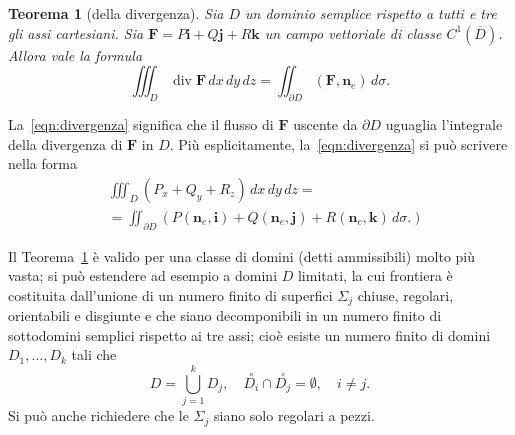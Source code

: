 \documentclass[a4paper]{book}
\DeclareMathOperator{\divg}{div}
\numberwithin{equation}{section}
\theoremstyle{plain}
\newtheorem{teor}{Teorema}[section]
\theoremstyle{definition}
\theoremstyle{remark}
\renewcommand{\vec}{\boldsymbol}
\theoremstyle{example}
\begin{document}
\begin{teor}[della divergenza]
	\label{divergenza}
	Sia $D$ un dominio semplice rispetto a tutti e tre gli assi cartesiani. Sia $\vec{F} = P\vec{i} + Q\vec{j} + R\vec{k}$ un campo vettoriale di classe $C^1(\overline{D})$. Allora vale la formula
		\begin{equation}
			\label{eqn:divergenza}
			\iiint_D \divg \vec{F} \, dx \, dy \, dz = \iint_{\partial D} (\vec{F}, \vec{n}_e)\, d \sigma.
		\end{equation}
\end{teor}

La~\eqref{eqn:divergenza} significa che il flusso di $\vec{F}$ uscente da $\partial D$ uguaglia l'integrale della divergenza di $\vec{F}$ in $D$. Più esplicitamente, la~\eqref{eqn:divergenza} si può scrivere nella forma
	\begin{equation*}
		\begin{split}
			&\iiint_D(P_x + Q_y + R_z)\,dx\,dy\,dz = \\
			&= \iint_{\partial D}(P(\vec{n}_e, \vec{i}) + Q(\vec{n}_e, \vec{j}) + R(\vec{n}_e, \vec{k})\,d\sigma.)
		\end{split}
	\end{equation*}

	Il Teorema~\ref{divergenza} è valido per una classe di domini (detti ammissibili) molto più vasta; si può estendere ad esempio a domini $D$ limitati, la cui frontiera è costituita dall'unione di un numero finito di superfici $\Sigma_j$ chiuse, regolari, orientabili e disgiunte e che siano decomponibili in un numero finito di sottodomini semplici rispetto ai tre assi; cioè esiste un numero finito di domini $D_1, \dots, D_k$ tali che
		\begin{equation*}
			D=\bigcup_{j=1}^k D_j, \quad \overset{\circ}{D_i}\cap\overset{\circ}{D_j} = \emptyset, \quad i \ne j.
		\end{equation*}
		Si può anche richiedere che le $\Sigma_j$ siano solo regolari a pezzi.
\end{document}
